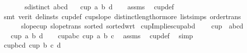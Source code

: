 \begin{isabellebody}
\ \ \ \ \ \ \ {\isachardoublequoteopen}sdistinct\ {\isacharbrackleft}{\kern0pt}a{\isacharcomma}{\kern0pt}b{\isacharcomma}{\kern0pt}c{\isacharcomma}{\kern0pt}d{\isacharbrackright}{\kern0pt}{\isachardoublequoteclose}\isanewline
{}\ \ \ {\isachardoublequoteopen}cup{}\ a\ b\ d{\isachardoublequoteclose}\isanewline
%
\isadelimproof
\ \ %
\endisadelimproof
%
\isatagproof
{}\isamarkupfalse%
\ assms\ \isamarkupfalse%
\ cup{}{\isacharunderscore}{\kern0pt}def\isanewline
\ \ \isamarkupfalse%
\ {\isacharparenleft}{\kern0pt}smt\ {\isacharparenleft}{\kern0pt}verit{\isacharcomma}{\kern0pt}\ del{\isacharunderscore}{\kern0pt}insts{\isacharparenright}{\kern0pt}\ cup{}{\isacharunderscore}{\kern0pt}def\ cup{}{\isacharunderscore}{\kern0pt}slope\ distinct{\isacharunderscore}{\kern0pt}length{\isacharunderscore}{\kern0pt}{}{\isacharunderscore}{\kern0pt}or{\isacharunderscore}{\kern0pt}more\ list{\isachardot}{\kern0pt}simps{\isacharparenleft}{\kern0pt}{}{\isacharparenright}{\kern0pt}\ order{\isachardot}{\kern0pt}trans\isanewline
\ \ \ \ \ \ slope{\isacharunderscore}{\kern0pt}cup{}\ slope{\isacharunderscore}{\kern0pt}trans{\isacharparenleft}{\kern0pt}{}{\isacharparenright}{\kern0pt}\ sorted{}\ sorted{\isacharunderscore}{\kern0pt}wrt{}{\isacharparenright}{\kern0pt}%
\endisatagproof
{\isafoldproof}%
%
\isadelimproof
\isanewline
%
\endisadelimproof
\isanewline
{}\isamarkupfalse%
\ cup{}Impliescup{}abd{\isacharcolon}{\kern0pt}\isanewline
\ \ \ \ {\isachardoublequoteopen}cup\ {}\ {\isacharbrackleft}{\kern0pt}a{\isacharcomma}{\kern0pt}b{\isacharcomma}{\kern0pt}c{\isacharcomma}{\kern0pt}d{\isacharbrackright}{\kern0pt}{\isachardoublequoteclose}\isanewline
\ \ \ {\isachardoublequoteopen}cup{}\ a\ b\ d{\isachardoublequoteclose}\isanewline
%
\isadelimproof
%
\endisadelimproof
%
\isatagproof
{}\isamarkupfalse%
{\isacharminus}{\kern0pt}\isanewline
\ \ \isamarkupfalse%
\ cup{\isacharunderscore}{\kern0pt}abc{\isacharcolon}{\kern0pt}\ {\isachardoublequoteopen}cup{}\ a\ b\ c{\isachardoublequoteclose}\ \isamarkupfalse%
\ assms\ \isamarkupfalse%
\ cup{\isacharunderscore}{\kern0pt}def\ \isamarkupfalse%
\ simp\isanewline
\ \ \isamarkupfalse%
\ cup{\isacharunderscore}{\kern0pt}bcd{\isacharcolon}{\kern0pt}\ {\isachardoublequoteopen}cup{}\ b\ c\ d{\isachardoublequoteclose}\ \isamarkupfalse%

\end{isabellebody}
